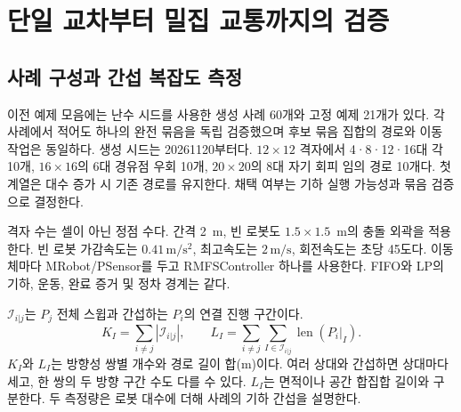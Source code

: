 \documentclass[11pt,a4paper]{article}
\theoremstyle{remark}
\begin{document}
\section{단일 교차부터 밀집 교통까지의 검증}
\label{sec:validation}
\subsection{사례 구성과 간섭 복잡도 측정}
이전 예제 모음에는 난수 시드를 사용한 생성 사례 60개와 고정 예제 21개가 있다. 각 사례에서 적어도 하나의 완전 묶음을 독립 검증했으며 후보 묶음 집합의 경로와 이동 작업은 동일하다. 생성 시드는 20261120부터다. $12\times12$ 격자에서 4·8·12·16대 각 10개, $16\times16$의 6대 경유점 우회 10개, $20\times20$의 8대 자기 회피 임의 경로 10개다. 첫 계열은 대수 증가 시 기존 경로를 유지한다. 채택 여부는 기하 실행 가능성과 묶음 검증으로 결정한다.

격자 수는 셀이 아닌 정점 수다. 간격 2~m, 빈 로봇도 $1.5\times1.5$~m의 충돌 외곽을 적용한다. 빈 로봇 가감속도는 $0.41\,\mathrm{m/s^2}$, 최고속도는 $2\,\mathrm{m/s}$, 회전속도는 초당 45도다. 이동체마다 MRobot/PSensor를 두고 RMFSController 하나를 사용한다. FIFO와 LP의 기하, 운동, 완료 증거 및 정차 경계는 같다.

$\mathcal I_{i|j}$는 $P_j$ 전체 스윕과 간섭하는 $P_i$의 연결 진행 구간이다.
\begin{equation}
 K_I=\sum_{i\ne j}|\mathcal I_{i|j}|,\qquad
 L_I=\sum_{i\ne j}\sum_{I\in\mathcal I_{i|j}}\operatorname{len}(P_i|_I).
 \label{eq:validation-complexity}
\end{equation}
$K_I$와 $L_I$는 방향성 쌍별 개수와 경로 길이 합(m)이다. 여러 상대와 간섭하면 상대마다 세고, 한 쌍의 두 방향 구간 수도 다를 수 있다. $L_I$는 면적이나 공간 합집합 길이와 구분한다. 두 측정량은 로봇 대수에 더해 사례의 기하 간섭을 설명한다.
\end{document}
